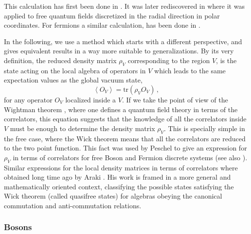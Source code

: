 \documentclass[11pt]{article}
\begin{document}
This calculation has first been done in \cite{bombelli}. It was later rediscovered in \cite{srednicki} where it was applied to free quantum fields discretized in the radial direction in polar coordinates. For fermions a similar calculation, has been done in \cite{vidal}. 

In the following, we use a method which starts with a different perspective, and gives equivalent results in a way more suitable to generalizations. By its very definition, the reduced density matrix $\rho_V$ corresponding to the region $V$, is the state acting on the local algebra of operators in $V$ which leads to the same expectation values as the global vacuum state,
\begin{equation}
\left\langle O_{V}\right\rangle =\textrm{tr}(\rho
_{V}O_{V})\,,\label{nueve}
\end{equation}
 for any
operator $O_{V}$ localized inside a $V$. If we take the point of view of the Wightman theorem \cite{wightman}, where one defines a quantum field theory in terms of the correlators, this equation suggests that the knowledge of all the correlators inside $V$ must be enough to determine the density matrix $\rho_V$. This is specially simple in the free case, where the Wick theorem means that all the correlators are reduced to the two point function. This fact was
used by Peschel to give an expression for $\rho _{V}$ in
terms of correlators for free Boson and Fermion discrete systems \cite{peschel} (see also \cite{vidal}). Similar expressions for the local density matrices in terms of correlators where obtained long time ago by Araki \cite{araki}. His work is framed in a more general and mathematically oriented context, classifying the possible states satisfying the Wick theorem (called quasifree states) for algebras obeying the canonical commutation and anti-commutation relations.   

\subsubsection{Bosons}
\end{document}
